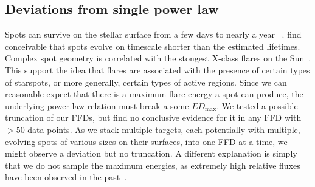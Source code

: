 \documentclass{aa}
\begin{document}
\subsection{Deviations from single power law}
Spots can survive on the stellar surface from a few days to nearly a year~
\citep{namekata_solarstellarwlf_2017, davenport_flaresandspots_2015}. \citet{namekata_solarstellarwlf_2017} find conceivable that spots evolve on timescale shorter than the estimated lifetimes. Complex spot geometry is correlated with the stongest X-class flares on the Sun~\citep{toriumi_flaresspotssun_2017, sammis_deltaspotsflares_2000}. This support the idea that flares are associated with the presence of certain types of starspots, or more generally, certain types of active regions. Since we can reasonable expect that there is a maximum flare energy a spot can produce, the underlying power law relation must break a some $ED_\mathrm{max}$. We tested a possible truncation of our FFDs, but find no conclusive evidence for it in any FFD with $>50$ data points. As we stack multiple targets, each potentially with multiple, evolving spots of various sizes on their surfaces, into one FFD at a time, we might observe a deviation but no truncation. A different explanation is simply that we do not sample the maximum energies, as extremely high relative fluxes have been observed in the past~\citep{paudel_monsterucdflare_2018, jackman_superflareucd_2019, schmidt_superflareasassn_2016}.
\end{document}
